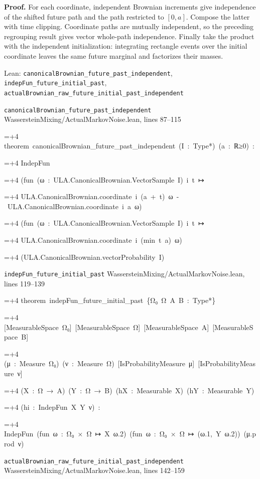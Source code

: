\documentclass[11pt,a4paper]{report}
\newlength{\leancharwidth}
\newenvironment{leancode}{\par\smallskip\begingroup\ttfamily\footnotesize\raggedright
  \settowidth{\leancharwidth}{M}\setlength{\parskip}{0pt}\setlength{\parindent}{0pt}
  \frenchspacing}{\par\endgroup\smallskip}
\newcommand{\leanline}[2]{\hangindent=\dimexpr#1\leancharwidth+4\leancharwidth\relax
  \hangafter=1\noindent\hspace*{#1\leancharwidth}#2\par}
\newcommand{\leansource}[1]{\par{\footnotesize\color{leanmuted}#1}\par}
\begin{document}
\textbf{Proof.} For each coordinate, independent Brownian increments give independence of the shifted future path and the path restricted to \([0,a]\). Compose the latter with time clipping. Coordinate paths are mutually independent, so the preceding regrouping result gives vector whole-path independence. Finally take the product with the independent initialization: integrating rectangle events over the initial coordinate leaves the same future marginal and factorizes their masses.

\begin{leanbox}{Lean: \texttt{canonicalBrownian\_\allowbreak{}future\_\allowbreak{}past\_\allowbreak{}independent}, \texttt{indepFun\_\allowbreak{}future\_\allowbreak{}initial\_\allowbreak{}past}, \texttt{actualBrownian\_\allowbreak{}raw\_\allowbreak{}future\_\allowbreak{}initial\_\allowbreak{}past\_\allowbreak{}independent}}
\leansource{\texttt{canonicalBrownian\_\allowbreak{}future\_\allowbreak{}past\_\allowbreak{}independent} \quad WassersteinMixing/\allowbreak{}ActualMarkovNoise.lean, lines 87–115}
\begin{leancode}
\leanline{0}{theorem\ canonicalBrownian\_future\_past\_independent\ (I\ :\ Type*)\ (a\ :\ ℝ≥0)\ :}
\leanline{4}{IndepFun}
\leanline{6}{(fun\ (ω\ :\ ULA.CanonicalBrownian.VectorSample\ I)\ i\ t\ ↦}
\leanline{8}{ULA.CanonicalBrownian.coordinate\ i\ (a\ +\ t)\ ω\ -\ ULA.CanonicalBrownian.coordinate\ i\ a\ ω)}
\leanline{6}{(fun\ (ω\ :\ ULA.CanonicalBrownian.VectorSample\ I)\ i\ t\ ↦}
\leanline{8}{ULA.CanonicalBrownian.coordinate\ i\ (min\ t\ a)\ ω)}
\leanline{6}{(ULA.CanonicalBrownian.vectorProbability\ I)}
\end{leancode}
\leansource{\texttt{indepFun\_\allowbreak{}future\_\allowbreak{}initial\_\allowbreak{}past} \quad WassersteinMixing/\allowbreak{}ActualMarkovNoise.lean, lines 119–139}
\begin{leancode}
\leanline{0}{theorem\ indepFun\_future\_initial\_past\ \{Ω₀\ Ω\ A\ B\ :\ Type*\}}
\leanline{4}{[MeasurableSpace\ Ω₀]\ [MeasurableSpace\ Ω]\ [MeasurableSpace\ A]\ [MeasurableSpace\ B]}
\leanline{4}{(μ\ :\ Measure\ Ω₀)\ (ν\ :\ Measure\ Ω)\ [IsProbabilityMeasure\ μ]\ [IsProbabilityMeasure\ ν]}
\leanline{4}{(X\ :\ Ω\ →\ A)\ (Y\ :\ Ω\ →\ B)\ (hX\ :\ Measurable\ X)\ (hY\ :\ Measurable\ Y)}
\leanline{4}{(hi\ :\ IndepFun\ X\ Y\ ν)\ :}
\leanline{4}{IndepFun\ (fun\ ω\ :\ Ω₀\ ×\ Ω\ ↦\ X\ ω.2)\ (fun\ ω\ :\ Ω₀\ ×\ Ω\ ↦\ (ω.1,\ Y\ ω.2))\ (μ.prod\ ν)}
\end{leancode}
\leansource{\texttt{actualBrownian\_\allowbreak{}raw\_\allowbreak{}future\_\allowbreak{}initial\_\allowbreak{}past\_\allowbreak{}independent} \quad WassersteinMixing/\allowbreak{}ActualMarkovNoise.lean, lines 142–159}

\end{leanbox}
\end{document}
